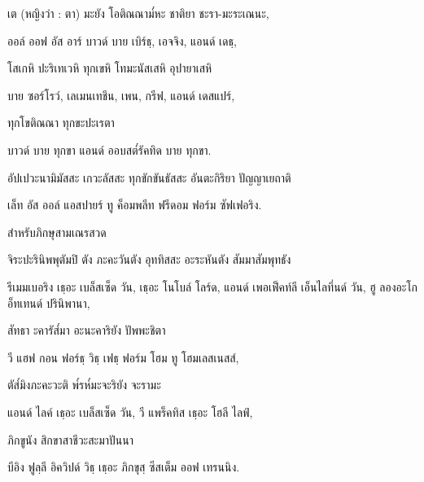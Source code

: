 เต (หญิงว่า : ตา) มะยัง โอติณณาม๎หะ ชาติยา ชะรา-มะระเณนะ,

\begin{english}
ออล์ ออฟ อัส อาร์ บาวด์ บาย เบิร์ธฺ, เอจจิง, แอนด์ เดธฺ,
\end{english}

โสเกหิ ปะริเทเวหิ ทุกเขหิ โทมะนัสเสหิ อุปายาเสหิ

\begin{english}
บาย ซอร์โรว์, เลเมนเทชึน, เพน, กรีฟ, แอนด์ เดสแปร์,
\end{english}

ทุกโขติณณา ทุกขะปะเรตา

\begin{english}
บาวด์ บาย ทุกขา แอนด์ ออบสต๎รัคทิด บาย ทุกขา.
\end{english}

อัปเปวะนามิมัสสะ เกวะลัสสะ ทุกขักขันธัสสะ อันตะกิริยา ปัญญาเยถาติ

\begin{english}
เล็ท อัส ออล์ แอสปายร์ ทู ค็อมพลีท ฟรีดอม ฟอร์ม ซัฟเฟอริง.
\end{english}

\begin{instruction}
สำหรับภิกษุสามเณรสวด
\end{instruction}

จิระปะรินิพพุตัมปิ ตัง ภะคะวันตัง อุททิสสะ อะระหันตัง สัมมาสัมพุทธัง

\begin{english}
รีเมมเบอริง เธฺอะ เบล็สเซ็ด  วัน, เธฺอะ โนโบล์ โลร์ด, แอนด์ เพอเฟ็คท์ลี เอ็นไลทึ่นด์ วัน, ฮู ลองอะโก อ็ทเทนด์ ปรินิพานา,
\end{english}

สัทธา ะคารัส๎มา อะนะคาริยัง ปัพพะชิตา

\begin{english}
วี แฮฟ กอน ฟอร์ธฺ วิธฺ เฟธฺ ฟอร์ม โฮม ทู โฮมเลสเนสส์,
\end{english}

ตัส๎มิงภะคะวะติ พ๎รห๎มะจะริยัง จะรามะ

\begin{english}
แอนด์ ไลค์ เธฺอะ เบล็สเซ็ด  วัน, วี แพร็คทิส เธฺอะ โฮลี ไลฟ์,
\end{english}

ภิกขูนัง สิกขาสาชีวะสะมาปันนา

\begin{english}
บีอิง ฟูลฺลี อิควิปด์ วิธฺ เธฺอะ ภิกขุสฺ ซีสเต็ม ออฟ เทรนนิง.
\end{english}

